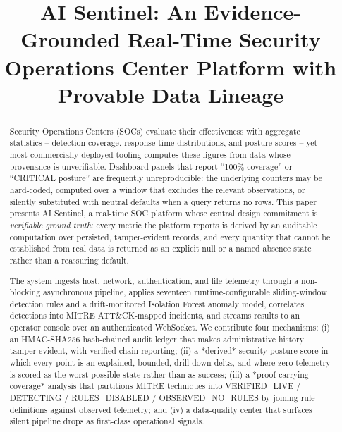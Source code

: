 \documentclass[conference]{IEEEtran}
\begin{document}
\title{AI Sentinel: An Evidence-Grounded Real-Time Security\\ Operations Center Platform with Provable Data Lineage}

\author{
}

\begin{abstract}
Security Operations Centers (SOCs) evaluate their effectiveness with
aggregate statistics -- detection coverage, response-time distributions,
and posture scores -- yet most commercially deployed tooling computes these
figures from data whose provenance is unverifiable. Dashboard panels that
report ``100\% coverage'' or ``CRITICAL posture'' are frequently
unreproducible: the underlying counters may be hard-coded, computed over a
window that excludes the relevant observations, or silently substituted with
neutral defaults when a query returns no rows. This paper presents AI
Sentinel, a real-time SOC platform whose central design commitment is
\emph{verifiable ground truth}: every metric the platform reports is derived
by an auditable computation over persisted, tamper-evident records, and
every quantity that cannot be established from real data is returned as an
explicit null or a named absence state rather than a reassuring default.

The system ingests host, network, authentication, and file telemetry through
a non-blocking asynchronous pipeline, applies seventeen runtime-configurable
sliding-window detection rules and a drift-monitored Isolation Forest anomaly
model, correlates detections into MITRE ATT\&CK-mapped incidents, and streams
results to an operator console over an authenticated WebSocket. We contribute
four mechanisms: (i) an HMAC-SHA256 hash-chained audit ledger that makes
administrative history tamper-evident, with verified-chain reporting;
(ii) a *derived* security-posture score in which every point is an explained,
bounded, drill-down delta, and where zero telemetry is scored as the worst
possible state rather than as success; (iii) a *proof-carrying coverage*
analysis that partitions MITRE techniques into
VERIFIED\_LIVE / DETECTING / RULES\_DISABLED / OBSERVED\_NO\_RULES by joining
rule definitions against observed telemetry; and (iv) a data-quality center
that surfaces silent pipeline drops as first-class operational signals.


\end{abstract}
\end{document}
